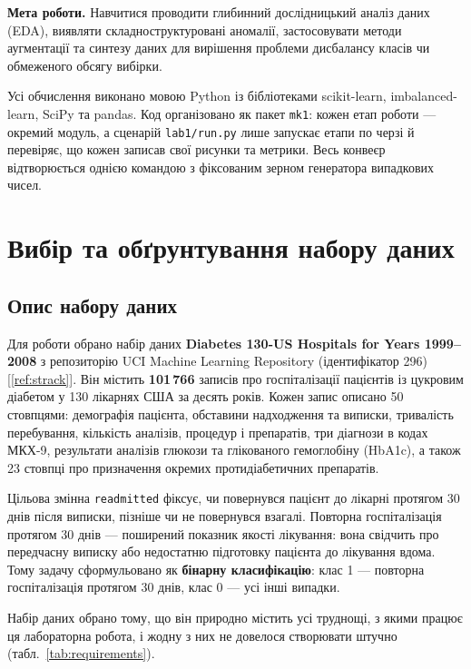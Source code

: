 \documentclass[14pt,a4paper]{extreport}
\begin{document}

\textbf{Мета роботи.} Навчитися проводити глибинний дослідницький аналіз даних (EDA), виявляти складноструктуровані аномалії, застосовувати методи аугментації та синтезу даних для вирішення проблеми дисбалансу класів чи обмеженого обсягу вибірки.

Усі обчислення виконано мовою Python із бібліотеками scikit-learn, imbalanced-learn, SciPy та pandas. Код організовано як пакет \texttt{mk1}: кожен етап роботи --- окремий модуль, а сценарій \texttt{lab1/run.py} лише запускає етапи по черзі й перевіряє, що кожен записав свої рисунки та метрики. Весь конвеєр відтворюється однією командою з фіксованим зерном генератора випадкових чисел.

\section{Вибір та обґрунтування набору даних}

\subsection{Опис набору даних}

Для роботи обрано набір даних \textbf{Diabetes 130-US Hospitals for Years 1999--2008} з репозиторію UCI Machine Learning Repository (ідентифікатор 296) [\ref{ref:strack}]. Він містить \textbf{101\,766} записів про госпіталізації пацієнтів із цукровим діабетом у 130 лікарнях США за десять років. Кожен запис описано 50 стовпцями: демографія пацієнта, обставини надходження та виписки, тривалість перебування, кількість аналізів, процедур і препаратів, три діагнози в кодах МКХ-9, результати аналізів глюкози та глікованого гемоглобіну (HbA1c), а також 23 стовпці про призначення окремих протидіабетичних препаратів.

Цільова змінна \texttt{readmitted} фіксує, чи повернувся пацієнт до лікарні протягом 30 днів після виписки, пізніше чи не повернувся взагалі. Повторна госпіталізація протягом 30 днів --- поширений показник якості лікування: вона свідчить про передчасну виписку або недостатню підготовку пацієнта до лікування вдома. Тому задачу сформульовано як \textbf{бінарну класифікацію}: клас 1 --- повторна госпіталізація протягом 30 днів, клас 0 --- усі інші випадки.

Набір даних обрано тому, що він природно містить усі труднощі, з якими працює ця лабораторна робота, і жодну з них не довелося створювати штучно (табл.~\ref{tab:requirements}).
\end{document}
